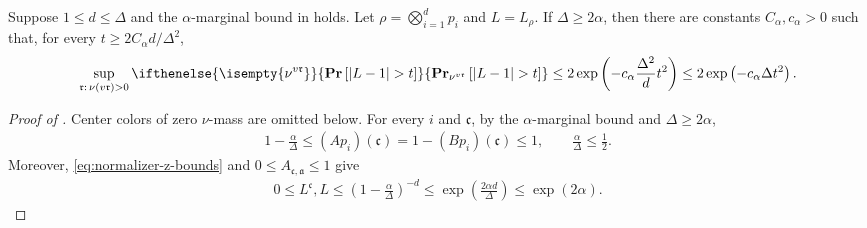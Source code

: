 \documentclass[a4paper,12pt]{article}
\theoremstyle{plain}
\theoremstyle{definition}
\def\*#1{\mathbf{#1}} %
\def\-#1{\mathrm{#1}} %
\def\!#1{\mathfrak{#1}} %
\def\*#1{\boldsymbol{#1}} %
\def\-#1{\mathrm{#1}} %
\def\!#1{\mathfrak{#1}} %
\def\oPr{\mathbf{Pr}}
\renewcommand{\Pr}[2][]{ \ifthenelse{\isempty{#1}}
  {\oPr\left[#2\right]}
  {\oPr_{#1}\left[#2\right]} } %
\newcommand{\tuple}[1]{\left(#1\right)}
\newcommand{\tp}{\tuple}
\newcommand{\abs}[1]{\left\vert#1\right\vert}
\begin{document}
\begin{proposition}\label{prop:normalizer-conditional-tail}
Suppose $1\leq d\leq\Delta$ and the $\alpha$-marginal bound in
 holds.  Let
$\rho=\bigotimes_{i=1}^d p_i$ and $L=L_\rho$.
If $\Delta\geq2\alpha$, then there
are constants $C_{\alpha},c_{\alpha}>0$ such that, for
every $t\geq2C_{\alpha}d/\Delta^2$,
\begin{align}
  \sup_{\!r:\,\nu(v\!r)>0}
  \Pr[\nu^{v\!r}]{\abs{L-1}>t}
  \leq
  2\exp\tp{-c_{\alpha}\frac{\Delta^2}{d}t^2}
  \leq
  2\exp\tp{-c_{\alpha}\Delta t^2}.
  \label{eq:normalizer-conditional-tail}
\end{align}
\end{proposition}

\begin{proof}[Proof of ]
Center colors of zero $\nu$-mass are omitted below.
%
For every $i$ and $\!c$, by the $\alpha$-marginal bound and $\Delta \geq 2\alpha$,
\begin{align}
  1-\frac{\alpha}{\Delta}
  \leq
  (Ap_i)(\!c)
  =1-(Bp_i)(\!c)
  \leq 1,
  \qquad
  \frac{\alpha}{\Delta}\leq\frac12.
  \label{eq:normalizer-z-bounds}
\end{align}
Moreover, \eqref{eq:normalizer-z-bounds} and
$0\leq A_{\!c,\!a}\leq1$ give
\begin{align}
  0\leq L^{\!c},L
  \leq
  \tp{1-\frac{\alpha}{\Delta}}^{-d}
  \leq
  \exp\tp{\frac{2\alpha d}{\Delta}}
  \leq
  \exp(2\alpha).
  \label{eq:normalizer-uniform-bound}
\end{align}


\end{proof}
\end{document}
